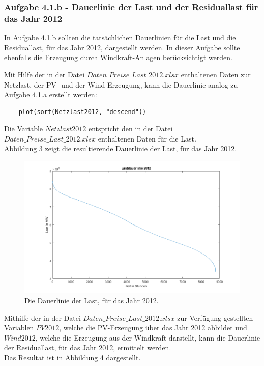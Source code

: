 \documentclass[a4paper,12pt]{article}
\begin{document}
	\subsubsection{Aufgabe 4.1.b - Dauerlinie der Last und der Residuallast für das Jahr 2012}
	In Aufgabe 4.1.b sollten die tatsächlichen Dauerlinien für die Last und die Residuallast, für das Jahr 2012, dargestellt werden. In dieser Aufgabe sollte ebenfalls die Erzeugung durch Windkraft-Anlagen berücksichtigt werden.\\ \par
	\noindent Mit Hilfe der in der Datei $Daten\_Preise\_Last\_2012.xlsx$ enthaltenen Daten zur Netzlast, der PV- und der Wind-Erzeugung, kann die Dauerlinie analog zu Aufgabe 4.1.a erstellt werden:
	\begin{lstlisting}
	plot(sort(Netzlast2012, "descend"))
	\end{lstlisting}
	Die Variable $Netzlast2012$ entspricht den in der Datei $Daten\_Preise\_Last\_2012.xlsx$ enthaltenen Daten für die Last.\\
	Abbildung 3 zeigt die resultierende Dauerlinie der Last, für das Jahr 2012.
	\begin{figure}[H]
		\centering
		\includegraphics[width=12cm]{img/results/Lastdauerlinie2012}
		\caption{Die Dauerlinie der Last, für das Jahr 2012.}
	\end{figure}
	Mithilfe der in der Datei $Daten\_Preise\_Last\_2012.xlsx$ zur Verfügung gestellten Variablen $PV2012$, welche die PV-Erzeugung über das Jahr 2012 abbildet und $Wind2012$, welche die Erzeugung aus der Windkraft darstellt, kann die Dauerlinie der Residuallast, für das Jahr 2012, ermittelt werden.\\
	Das Resultat ist in Abbildung 4 dargestellt.
\end{document}
